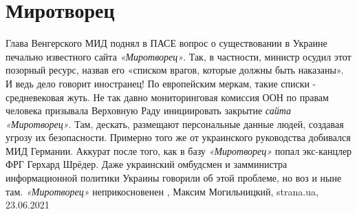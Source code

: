  
 
 
 
 
\chapter{Миротворец}

Глава Венгерского МИД поднял в ПАСЕ вопрос о существовании в Украине печально
известного сайта \emph{«Миротворец»}.  Так, в частности, министр осудил этот
позорный ресурс, назвав его «списком врагов, которые должны быть наказаны». И
ведь дело говорит иностранец! По европейским меркам, такие списки -
средневековая жуть.  Не так давно мониторинговая комиссия ООН по правам
человека призывала Верховную Раду инициировать закрытие \emph{сайта
«Миротворец»}. Там, дескать, размещают персональные данные людей, создавая
угрозу их безопасности.  Примерно того же от украинского руководства добивался
МИД Германии. Аккурат после того, как в базу \emph{«Миротворец»} попал
экс-канцлер ФРГ Герхард Шрёдер.  Даже украинский омбудсмен и замминистра
информационной политики Украины говорили об этой проблеме, но воз и ныне там.
\emph{«Миротворец»} неприкосновенен
, 
Максим Могильницкий, strana.ua, 23.06.2021

